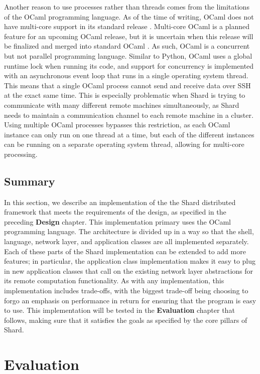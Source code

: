 \documentclass[oneside]{report}
\begin{document}
Another reason to use processes rather than threads comes from the limitations of the OCaml programming language.
As of the time of writing, OCaml does not have multi-core support in its standard release
\cite{dolan2014multicore}.
Multi-core OCaml is a planned feature for an upcoming OCaml release, but it is uncertain when this release will be finalized and merged into standard OCaml \cite{sivaramakrishnan2020retrofitting}.
As such, OCaml is a concurrent but not parallel programming language.
Similar to Python, OCaml uses a global runtime lock when running its code, and support for concurrency is implemented with an asynchronous event loop that runs in a single operating system thread.
This means that a single OCaml process cannot send and receive data over SSH at the exact same time.
This is especially problematic when Shard is trying to communicate with many different remote machines simultaneously, as Shard needs to maintain a communication channel to each remote machine in a cluster.
Using multiple OCaml processes bypasses this restriction, as each OCaml instance can only run on one thread at a time, but each of the different instances can be running on a separate operating system thread, allowing for multi-core processing.

\section{Summary}

In this section, we describe an implementation of the the Shard distributed framework that meets the requirements of the design, as specified in the preceding \textbf{Design} chapter.
This implementation primary uses the OCaml programming language.
The architecture is divided up in a way so that the shell, language, network layer, and application classes are all implemented separately.
Each of these parts of the Shard implementation can be extended to add more features; in particular, the application class implementation makes it easy to plug in new application classes that call on the existing network layer abstractions for its remote computation functionality.
As with any implementation, this implementation includes trade-offs, with the biggest trade-off being choosing to forgo an emphasis on performance in return for ensuring that the program is easy to use.
This implementation will be tested in the \textbf{Evaluation} chapter that follows, making sure that it satisfies the goals as specified by the core pillars of Shard.


\chapter{Evaluation}
\end{document}
